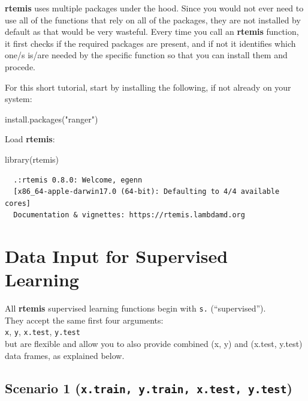 \documentclass[
]{book}
\newenvironment{Shaded}{\begin{snugshade}}{\end{snugshade}}
\newcommand{\FunctionTok}[1]{\textcolor[rgb]{0.00,0.00,0.00}{#1}}
\newcommand{\NormalTok}[1]{#1}
\newcommand{\StringTok}[1]{\textcolor[rgb]{0.31,0.60,0.02}{#1}}
\begin{document}
\textbf{rtemis} uses multiple packages under the hood. Since you would not ever need to use all of the functions that rely on all of the packages, they are not installed by default as that would be very wasteful. Every time you call an \textbf{rtemis} function, it first checks if the required packages are present, and if not it identifies which one/s is/are needed by the specific function so that you can install them and procede.

For this short tutorial, start by installing the following, if not already on your system:

\begin{Shaded}
\begin{Highlighting}[]
\FunctionTok{install.packages}\NormalTok{(}\StringTok{"ranger"}\NormalTok{)}
\end{Highlighting}
\end{Shaded}

Load \textbf{rtemis}:

\begin{Shaded}
\begin{Highlighting}[]
\FunctionTok{library}\NormalTok{(rtemis)}
\end{Highlighting}
\end{Shaded}

\begin{verbatim}
  .:rtemis 0.8.0: Welcome, egenn
  [x86_64-apple-darwin17.0 (64-bit): Defaulting to 4/4 available cores]
  Documentation & vignettes: https://rtemis.lambdamd.org
\end{verbatim}

\hypertarget{data-input-for-supervised-learning}{%
\section{Data Input for Supervised Learning}\label{data-input-for-supervised-learning}}

All \textbf{rtemis} supervised learning functions begin with \texttt{s.} (``supervised'').\\
They accept the same first four arguments:\\
\texttt{x}, \texttt{y}, \texttt{x.test}, \texttt{y.test}\\
but are flexible and allow you to also provide combined (x, y) and (x.test, y.test) data frames, as explained below.

\hypertarget{scenario-1-x.train-y.train-x.test-y.test}{%
\subsection{\texorpdfstring{Scenario 1 (\texttt{x.train,\ y.train,\ x.test,\ y.test})}{Scenario 1 (x.train, y.train, x.test, y.test)}}\label{scenario-1-x.train-y.train-x.test-y.test}}
\end{document}
